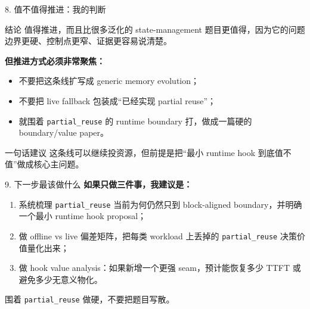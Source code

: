 \documentclass[10pt,aspectratio=169]{ctexbeamer}
\begin{document}
\begin{frame}{8. 值不值得推进：我的判断}
\begin{block}{结论}
值得推进，而且比很多泛化的 state-management 题目更值得，因为它的问题边界更硬、控制点更窄、证据更容易说清楚。
\end{block}

\vspace{0.4em}
\textbf{但推进方式必须非常聚焦：}
\begin{itemize}
  \item 不要把这条线扩写成 generic memory evolution；
  \item 不要把 live fallback 包装成“已经实现 partial reuse”；
  \item 就围着 \texttt{partial\_reuse} 的 runtime boundary 打，做成一篇硬的 boundary/value paper。
\end{itemize}

\vspace{0.4em}
\begin{alertblock}{一句话建议}
这条线可以继续投资源，但前提是把“最小 runtime hook 到底值不值”做成核心主问题。
\end{alertblock}
\end{frame}

\begin{frame}{9. 下一步最该做什么}
\textbf{如果只做三件事，我建议是：}

\begin{enumerate}
  \item 系统梳理 \texttt{partial\_reuse} 当前为何仍然只到 block-aligned boundary，并明确一个最小 runtime hook proposal；
  \item 做 offline vs live 偏差矩阵，把每类 workload 上丢掉的 \texttt{partial\_reuse} 决策价值量化出来；
  \item 做 hook value analysis：如果新增一个更强 seam，预计能恢复多少 TTFT 或避免多少无意义物化。
\end{enumerate}

\vspace{0.5em}
\centering
\Large \textcolor{PrimaryBlue}{围着 \texttt{partial\_reuse} 做硬，不要把题目写散。}
\end{frame}
\end{document}
